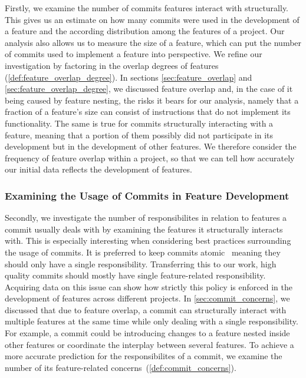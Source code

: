 Firstly, we examine the number of commits features interact with structurally. 
This gives us an estimate on how many commits were used in the development of a feature and the according distribution among the features of a project.
Our analysis also allows us to measure the size of a feature, which can put the number of commits used to implement a feature into perspective.
We refine our investigation by factoring in the overlap degrees of features (\autoref{def:feature_overlap_degree}). 
In sections \ref{sec:feature_overlap} and \ref{sec:feature_overlap_degree}, we discussed feature overlap and, in the case of it being caused by feature nesting, the risks it bears for our analysis, namely that a fraction of a feature's size can consist of instructions that do not implement its functionality.
The same is true for commits structurally interacting with a feature, meaning that a portion of them possibly did not participate in its development but in the development of other features.
We therefore consider the frequency of feature overlap within a project, so that we can tell how accurately our initial data reflects the development of features.

\subsubsection*{Examining the Usage of Commits in Feature Development}

Secondly, we investigate the number of responsibilites in relation to features a commit usually deals with by examining the features it structurally interacts with. 
This is especially interesting when considering best practices surrounding the usage of commits.
It is preferred to keep commits atomic~\cite{hundhausen2021commit_metrics} meaning they should only have a single responsibility.
Transferring this to our work, high quality commits should mostly have single feature-related responsibility.
Acquiring data on this issue can show how strictly this policy is enforced in the development of features across different projects. 
In \autoref{sec:commit_concerns}, we discussed that due to feature overlap, a commit can structurally interact with multiple features at the same time while only dealing with a single responsibility.
For example, a commit could be introducing changes to a feature nested inside other features or coordinate the interplay between several features.
To achieve a more accurate prediction for the responsibilites of a commit, we examine the number of its feature-related concerns~(\autoref{def:commit_concerns}).

